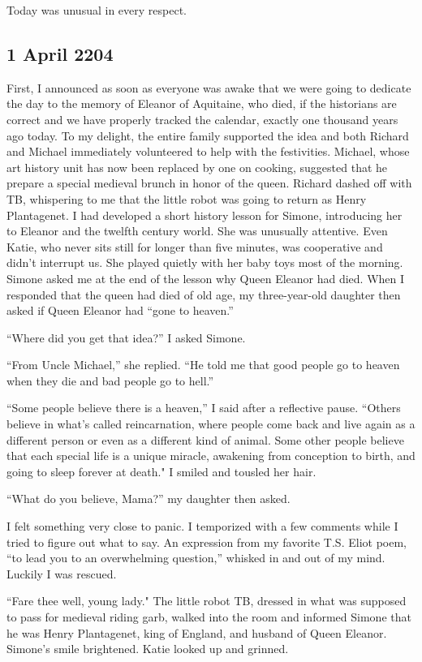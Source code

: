 \documentclass[]{article}
\begin{document}
Today was unusual in every respect.

\subsection*{1 April 2204}

First, I announced as soon as everyone was awake that we were going to dedicate the day to the memory of Eleanor of Aquitaine, who died, if the historians are correct and we have properly tracked the calendar, exactly one thousand years ago today.  To my delight, the entire family supported the idea and both Richard and Michael immediately volunteered to help with the festivities.  Michael, whose art history unit has now been replaced by one on cooking, suggested that he prepare a special medieval brunch in honor of the queen.  Richard dashed off with TB, whispering to me that the little robot was going to return as Henry Plantagenet.  I had developed a short history lesson for Simone, introducing her to Eleanor and the twelfth century world.  She was unusually attentive.  Even Katie, who never sits still for longer than five minutes, was cooperative and didn’t interrupt us.  She played quietly with her baby toys most of the morning.  Simone asked me at the end of the lesson why Queen Eleanor had died.  When I responded that the queen had died of old age, my three-year-old daughter then asked if Queen Eleanor had “gone to heaven.”

“Where did you get that idea?” I asked Simone.

“From Uncle Michael,” she replied.  “He told me that good people go to heaven when they die and bad people go to hell.”

“Some people believe there is a heaven,” I said after a reflective pause.  “Others believe in what’s called reincarnation, where people come back and live again as a different person or even as a different kind of animal.  Some other people believe that each special life is a unique miracle, awakening from conception to birth, and going to sleep forever at death."  I smiled and tousled her hair.

“What do you believe, Mama?” my daughter then asked.

I felt something very close to panic.  I temporized with a few comments while I tried to figure out what to say.  An expression from my favorite T.S.  Eliot poem, “to lead you to an overwhelming question,” whisked in and out of my mind.  Luckily I was rescued.

“Fare thee well, young lady."  The little robot TB, dressed in what was supposed to pass for medieval riding garb, walked into the room and informed Simone that he was Henry Plantagenet, king of England, and husband of Queen Eleanor.  Simone’s smile brightened.  Katie looked up and grinned.
\end{document}
